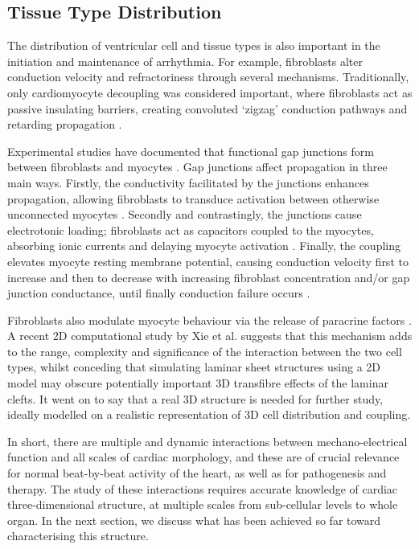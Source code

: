 
  \subsection{Tissue Type Distribution} %
  \label{sub:tissue_type_distribution}
    The distribution of ventricular cell and tissue types is also important in the initiation and maintenance of arrhythmia. For example, fibroblasts alter conduction velocity and refractoriness through several mechanisms. Traditionally, only cardiomyocyte decoupling was considered important, where fibroblasts act as passive insulating barriers, creating convoluted ‘zigzag’ conduction pathways and retarding propagation \cite{deBakker2006, Spach2007}.
  
    Experimental studies have documented that functional gap junctions form between fibroblasts and myocytes \cite{Camelliti2004, Camelliti2005, Walker2007}. Gap junctions affect propagation in three main ways.  Firstly, the conductivity facilitated by the junctions enhances propagation, allowing fibroblasts to transduce activation between otherwise unconnected myocytes \cite{Gaudesius2003, Zlochiver2008}. Secondly and contrastingly, the junctions cause electrotonic loading; fibroblasts act as capacitors coupled to the myocytes, absorbing ionic currents and delaying myocyte activation \cite{Jacquemet2007, Xie2009}. Finally, the coupling elevates myocyte resting membrane potential, causing conduction velocity first to increase and then to decrease with increasing fibroblast concentration and/or gap junction conductance, until finally conduction failure occurs \cite{Miragoli2006, Xie2009}.
  
    Fibroblasts also modulate myocyte behaviour via the release of paracrine factors \cite{Pedrotty2009}. A recent 2D computational study by Xie et al. \cite{Xie2009} suggests that this mechanism adds to the range, complexity and significance of the interaction between the two cell types, whilst conceding that simulating laminar sheet structures using a 2D model may obscure potentially important 3D transfibre effects of the laminar clefts. It went on to say that a real 3D structure is needed for further study, ideally modelled on a realistic representation of 3D cell distribution and coupling.
  
  In short, there are multiple and dynamic interactions between mechano-electrical function and all scales of cardiac morphology, and these are of crucial relevance for normal beat-by-beat activity of the heart, as well as for pathogenesis and therapy. The study of these interactions requires accurate knowledge of cardiac three-dimensional structure, at multiple scales from sub-cellular levels to whole organ. In the next section, we discuss what has been achieved so far toward characterising this structure.

